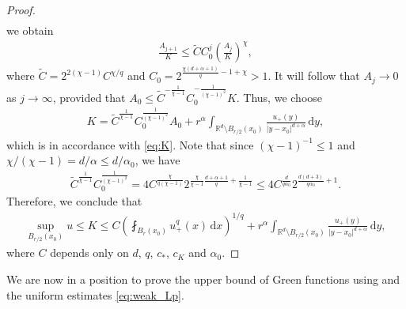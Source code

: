 \documentclass[reqno]{amsart}
\theoremstyle{plain}
\theoremstyle{definition}
\numberwithin{equation}{section}
\newcommand{\Rd}{\mathbb{R}^d}
\newcommand{\dx} {\, \mathrm{d}x}
\newcommand{\dy} {\, \mathrm{d}y}
\newcommand{\cl} {c_{\ast}}
\newcommand{\cK} {c_K}
\begin{document}
\begin{proof}
\begin{align*}
\end{align*}
we obtain
\begin{align*}
\frac{A_{j+1}}{K} \leq \tilde{C} C_0^j \left( \frac{A_j}{K} \right)^\chi,
\end{align*}
where $\tilde{C} = 2^{2(\chi-1)} C^{\chi/q}$ 
and $C_0 = 2^{\frac{\chi(d+\alpha+1)}{q} -1+ \chi} > 1$. It will follow that 
$A_j \rightarrow 0$ as $j \rightarrow \infty$, provided that $A_0 \leq 
\tilde{C}^{-\frac{1}{\chi-1}} C_0^{-\frac{1}{(\chi-1)^2}} K$. Thus, we choose
\begin{align*}
K = 
\tilde{C}^\frac{1}{\chi-1} C_0^\frac{1}{(\chi-1)^2} A_0
+ r^\alpha \int_{\Rd \setminus B_{r/2}(x_0)} \frac{u_+(y)}{| y - x_0 |^{d+\alpha}} \dy,
\end{align*}
which is in accordance with \eqref{eq:K}. Note that since $(\chi-1)^{-1} \leq 1$ 
and $\chi/(\chi-1) = d/\alpha \leq d/\alpha_0$, we have
\begin{align*}
\tilde{C}^\frac{1}{\chi-1} C_0^\frac{1}{(\chi-1)^2} 
= 4C^\frac{\chi}{q(\chi-1)} 2^{\frac{\chi}{\chi-1} \frac{d+\alpha+1}{q} + \frac{1}{\chi-1}} 
\leq 4C^\frac{d}{q\alpha_0} 2^{\frac{d(d+3)}{q\alpha_0}+1}.
\end{align*}
Therefore, we conclude that
\begin{align*}
\sup_{B_{r/2}(x_0)} u 
\leq K \leq C \left( \fint_{B_r(x_0)} u_+^q(x) \dx \right)^{1/q} 
+ r^\alpha \int_{\Rd \setminus B_{r/2}(x_0)} 
\frac{u_+(y)}{| y - x_0 |^{d+\alpha}} \dy,
\end{align*}
where $C$ depends only on $d$, $q$, $\cl$, $\cK$ and $\alpha_0$.
\end{proof}


We are now in a position to prove the upper bound of Green functions 
using  and the uniform estimates \eqref{eq:weak_Lp}. 
\end{document}
